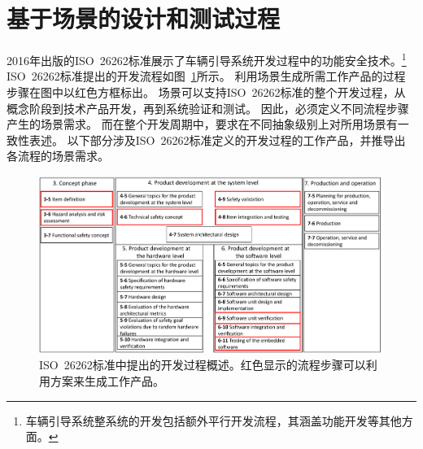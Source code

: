 \section{基于场景的设计和测试过程}
\label{process}
%
2016年出版的ISO~26262标准展示了车辆引导系统开发过程中的功能安全技术。\footnote{车辆引导系统整系统的开发包括额外平行开发流程，其涵盖功能开发等其他方面。}
ISO~26262标准提出的开发流程如图~\ref{fig:ISO-Prozess}所示。
利用场景生成所需工作产品的过程步骤在图中以红色方框标出。
场景可以支持ISO~26262标准的整个开发过程，从概念阶段到技术产品开发，再到系统验证和测试。
因此，必须定义不同流程步骤产生的场景需求。
而在整个开发周期中，要求在不同抽象级别上对所用场景有一致性表述。
以下部分涉及ISO~26262标准定义的开发过程的工作产品，并推导出各流程的场景需求。

\begin{figure}
	\centering
	\includegraphics[width=\textwidth]{./3_process/graphics/ISO_Prozess}
	\caption{ISO~26262标准中提出的开发过程概述。红色显示的流程步骤可以利用方案来生成工作产品。}
	\label{fig:ISO-Prozess}
\end{figure}

